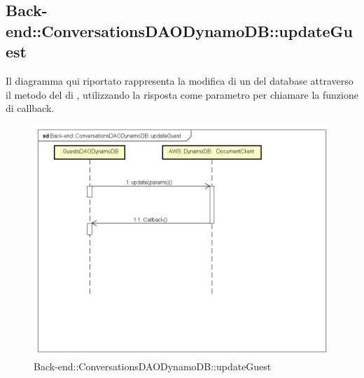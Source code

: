 \subsection{Back-end::ConversationsDAODynamoDB::updateGuest}
Il diagramma qui riportato rappresenta la modifica di un  del database attraverso il metodo  del  di , utilizzando la risposta come parametro per chiamare la funzione di callback.
 \begin{figure}[h] \centering \includegraphics[width=\textwidth,height=\textheight,keepaspectratio]{images/diagrams/back-end/Ufficial_Backend/Back-endConversationsDAODynamoDBupdateGuest.png} 	\caption{Back-end::ConversationsDAODynamoDB::updateGuest}
\end{figure} 
\newpage


